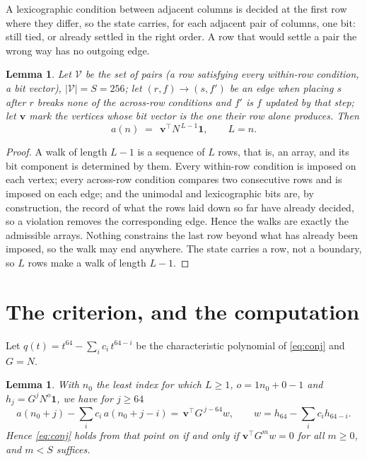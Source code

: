 \documentclass[11pt,a4paper]{article}
\theoremstyle{plain}
\newtheorem{lemma}[theorem]{Lemma}
\theoremstyle{definition}
\begin{document}
A lexicographic condition between adjacent columns is decided
at the first row where they differ, so the state carries, for each adjacent pair of
columns, one bit: still tied, or already settled in the right order. A row that would
settle a pair the wrong way has no outgoing edge.

\begin{lemma}\label{lem:walk}
Let $\mathcal V$ be the set of pairs (a row satisfying every within-row condition, a
bit vector), $|\mathcal V|=S=256$; let $(r,f)\to(s,f')$ be an edge when placing $s$ after $r$
breaks none of the across-row conditions and $f'$ is $f$ updated by that step; let
$\mathbf{v}$ mark the vertices whose bit vector is the one their row alone produces.
Then
\[
a(n)\;=\;\,\mathbf{v}^{\!\top}N^{\,L-1}\mathbf{1},\qquad L=n.
\]
\end{lemma}

\begin{proof}
A walk of length $L-1$ is a sequence of $L$ rows, that is, an array, and its bit component
is determined by them. Every within-row condition is imposed on each vertex; every
across-row condition compares two consecutive rows and is imposed on each edge; and the
unimodal and lexicographic bits are, by construction, the record of what the rows laid down
so far have already decided, so a violation removes the corresponding edge. Hence the walks
are exactly the admissible arrays. Nothing constrains the last row beyond what has already
been imposed, so the walk may end anywhere. The state carries a row, not a boundary, so
$L$ rows make a walk of length $L-1$.
\end{proof}

\section{The criterion, and the computation}

Let $q(t)=t^{64}-\sum_i c_i\,t^{64-i}$ be the characteristic polynomial of
\eqref{eq:conj} and $G=N$.

\begin{lemma}\label{lem:crit}
With $n_0$ the least index for which $L\ge1$, $o=1n_0+0-1$ and
$h_j=G^{j}N^{o}\mathbf{1}$, we have for $j\ge64$
\[
a(n_0+j)-\sum_i c_i\,a(n_0+j-i)=\,\mathbf{v}^{\!\top}G^{\,j-64}w,
\qquad w=h_{64}-\sum_i c_ih_{64-i} .
\]
Hence \eqref{eq:conj} holds from that point on if and only if
$\mathbf{v}^{\!\top}G^{m}w=0$ for all $m\ge0$, and $m<S$ suffices.
\end{lemma}
\end{document}
